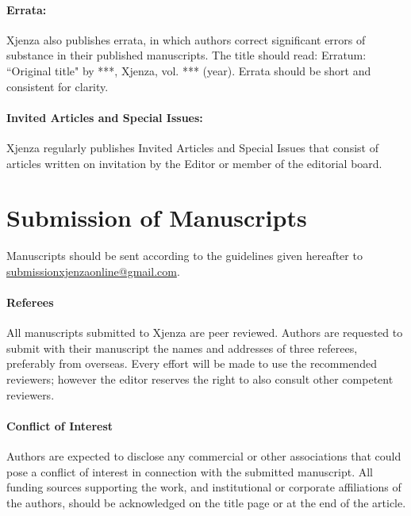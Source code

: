 \paragraph{Errata:} Xjenza also publishes errata, in which authors correct significant errors of substance in their published manuscripts. The title should read: Erratum: ``Original title" by ***, Xjenza, vol. *** (year). Errata should be short and consistent for clarity.

\paragraph{Invited Articles and Special Issues:} Xjenza regularly publishes Invited Articles and Special Issues that consist of articles written on invitation by the Editor or member of the editorial board.

\section*{Submission of Manuscripts}

Manuscripts should be sent according to the guidelines given hereafter to \href{mailto:submissionxjenzaonline@gmail.com}{submissionxjenzaonline@gmail.com}.


\paragraph{Referees}

All manuscripts submitted to Xjenza are peer reviewed. Authors are requested to submit with their manuscript the names and addresses of three referees, preferably from overseas. Every effort will be made to use the recommended reviewers; however the editor reserves the right to also consult other competent reviewers.

\paragraph{Conflict of Interest}

Authors are expected to disclose any commercial or other associations that could pose a conflict of interest in connection with the submitted manuscript. All funding sources supporting the work, and institutional or corporate affiliations of the authors, should be acknowledged on the title page or at the end of the article.

